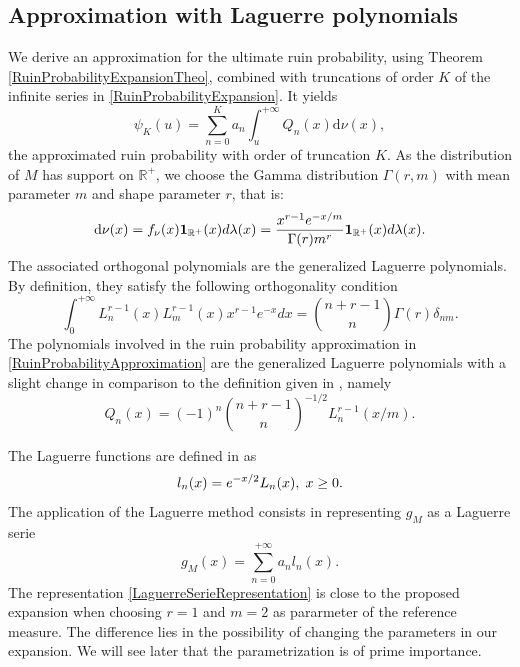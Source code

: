 \subsection{Approximation with Laguerre polynomials}
We derive an approximation for the ultimate ruin probability, using Theorem \ref{RuinProbabilityExpansionTheo}, combined with truncations of order $K$ of the infinite series in \eqref{RuinProbabilityExpansion}. It yields
\begin{equation}\label{RuinProbabilityApproximation}
\psi_{K}(u)=\sum_{n=0}^{K}a_{n}\int^{+\infty}_{u}Q_{n}(x)\text{d}\nu(x),
\end{equation}
the approximated ruin probability with order of truncation $K$.
As the distribution of $M$ has support on $\mathbb{R}^{+}$, we choose the Gamma distribution $\Gamma(r,m)$ with mean parameter $m$ and shape parameter $r$, that is:
\[
\text{d}\nu(x)=f_{\nu}(x)\bold{1}_{\mathbb{R}^{+}}(x)d\lambda(x)=\frac{x^{r-1} e^{-x/m}}{\Gamma(r)m^{r}}\bold{1}_{\mathbb{R}^{+}}(x)d\lambda(x).
\]
The associated orthogonal polynomials are the generalized Laguerre polynomials. By definition, they satisfy the following orthogonality condition
\[
\int_{0}^{+\infty}L^{r-1}_{n}(x)L^{r-1}_{m}(x)x^{r-1}e^{-x}dx=\binom{n+r-1}{n}\Gamma(r)\delta_{nm}.
\]
The polynomials involved in the ruin probability approximation in \eqref{RuinProbabilityApproximation} are the generalized Laguerre polynomials with a slight change in comparison to the definition given in \citet{Sz39}, namely
\begin{equation}
Q_{n}(x)=(-1)^{n}\binom{n+r-1}{n}^{-1/2}L^{r-1}_{n}(x/m).
\end{equation}
\begin{Rk}\label{RkLaguerreMethod}
The Laguerre functions are defined in \citet{AbChWh95} as 
\begin{equation}\label{LaguerreFunction}
l_{n}(x)=e^{-x/2}L_{n}(x),\hspace{0.1cm}x\geq0.
\end{equation}
The application of the Laguerre method consists in representing $g_{M}$ as a Laguerre serie
\begin{equation}\label{LaguerreSerieRepresentation}
g_{M}(x)=\sum_{n=0}^{+\infty}a_{n}l_{n}(x).
\end{equation} 
The representation \eqref{LaguerreSerieRepresentation} is close to the proposed expansion when choosing $r=1$ and $m=2$ as pararmeter of the reference measure. The difference lies in the possibility of changing the parameters in our expansion. We will see later that the parametrization is of prime importance. 
\end{Rk}
